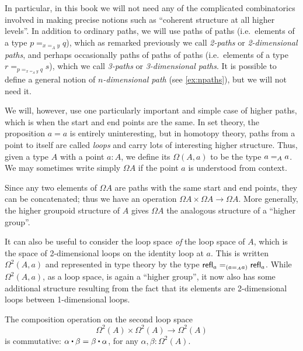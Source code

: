In particular, in this book we will not need any of the complicated combinatorics involved in making precise notions such as ``coherent structure at all higher levels''.
In addition to ordinary paths, we will use paths of paths (i.e.\ elements of a type $p =_{x=_A y} q$), which as remarked previously we call \emph{2-paths} or \emph{2-dimensional paths}, and perhaps occasionally paths of paths of paths (i.e.\ elements of a type $r = _{p =_{x=_A y} q} s$), which we call \emph{3-paths} or \emph{3-dimensional paths}.
It is possible to define a general notion of \emph{$n$-dimensional path}
%
%
%
%
(see \autoref{ex:npaths}), but we will not need it.

We will, however, use one particularly important and simple case of higher paths, which is when the start and end points are the same.
In set theory, the proposition $a=a$ is entirely uninteresting, but in homotopy theory, paths from a point to itself are called \emph{loops} and carry lots of interesting higher structure.
Thus, given a type $A$ with a point $a:A$, we define its 
%
$\Omega(A,a)$ to be the type $\id[A]{a}{a}$.
We may sometimes write simply $\Omega A$ if the point $a$ is understood from context.

Since any two elements of $\Omega A$ are paths with the same start and end points, they can be concatenated;
thus we have an operation $\Omega A\times \Omega A\to \Omega A$.
More generally, the higher groupoid structure of $A$ gives $\Omega A$ the analogous structure of a ``higher group''.

It can also be useful to consider the loop space \emph{of} the loop space of $A$, which is the space of 2-dimensional loops on the identity loop at $a$.
This is written $\Omega^2(A,a)$ and represented in type theory by the type $\id[({\id[A]{a}{a}})]{\refl{a}}{\refl{a}}$.
While $\Omega^2(A,a)$, as a loop space, is again a ``higher group'', it now also has some additional structure resulting from the fact that its elements are 2-dimensional loops between 1-dimensional loops.  

\begin{thm}\label{thm:EckmannHilton}
  The composition operation on the second loop space
  \begin{equation*}
    \Omega^2(A)\times \Omega^2(A)\to \Omega^2(A)
  \end{equation*}
  is commutative: $\alpha\ct\beta = \beta\ct\alpha$, for any $\alpha, \beta:\Omega^2(A)$.
\end{thm}

